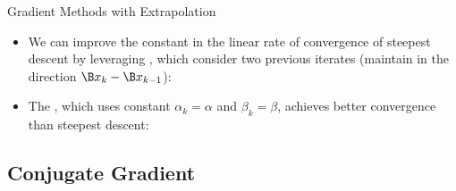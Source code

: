 \begin{frame}{Gradient Methods with Extrapolation}

\begin{itemize}
\item We can improve the constant in the linear rate of convergence of steepest descent by leveraging , which consider two previous iterates (maintain  in the direction $\B x_k -\B x_{k-1}$):
\lgcond{
\[\B x_{k+1} = \B x_k - \alpha_k \nabla f(\B x_k) + \beta_k(\B x_k - \B x_{k-1})\]


}

\item The , which uses constant $\alpha_k=\alpha $ and $\beta_k=\beta$, achieves better convergence than steepest descent:


\end{itemize}

\end{frame}

\subsection{Conjugate Gradient}


